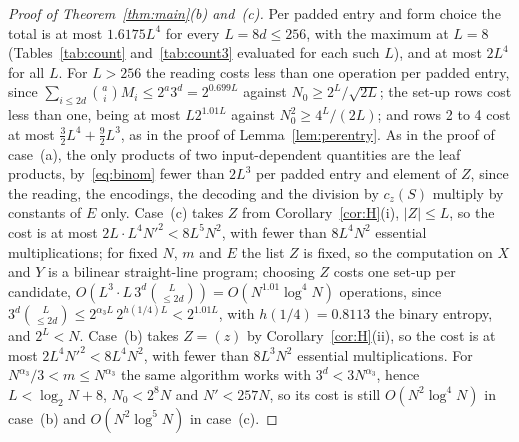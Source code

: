 \documentclass[11pt]{article}
\theoremstyle{definition}
\theoremstyle{remark}
\newcommand{\Nz}{N_0}
\begin{document}
\begin{proof}[Proof of Theorem~\ref{thm:main}(b) and~(c)]
Per padded entry and form choice the total is at most $1.6175L^4$ for every $L=8d\le256$, with the maximum at $L=8$ (Tables~\ref{tab:count} and~\ref{tab:count3} evaluated for each such $L$), and at most $2L^4$ for all $L$. For $L>256$ the reading costs less than one operation per padded entry, since $\sum_{i\le2d}\binom aiM_i\le2^a3^d=2^{0.699L}$ against $\Nz\ge2^L/\sqrt{2L}$; the set-up rows cost less than one, being at most $L2^{1.01L}$ against $\Nz^2\ge4^L/(2L)$; and rows 2 to 4 cost at most $\frac32L^4+\frac92L^3$, as in the proof of Lemma~\ref{lem:perentry}. %
As in the proof of case~(a), the only products of two input-dependent quantities are the leaf products, by~\eqref{eq:binom} fewer than $2L^3$ per padded entry and element of $Z$, since the reading, the encodings, the decoding and the division by $c_z(S)$ multiply by constants of $E$ only. Case~(c) takes $Z$ from Corollary~\ref{cor:H}(i), $|Z|\le L$, so the cost is at most $2L\cdot L^4N'^2<8L^5N^2$, with fewer than $8L^4N^2$ essential multiplications; for fixed $N$, $m$ and $E$ the list $Z$ is fixed, so the computation on $X$ and $Y$ is a bilinear straight-line program; choosing $Z$ costs one set-up per candidate, $O(L^3\cdot L\,3^d\binom L{\le2d})=O(N^{1.01}\log^4N)$ operations, since $3^d\binom L{\le2d}\le2^{\alpha_3L}\,2^{h(1/4)L}<2^{1.01L}$, with $h(1/4)=0.8113$ the binary entropy, and $2^L<N$. Case~(b) takes $Z=(z)$ by Corollary~\ref{cor:H}(ii), so the cost is at most $2L^4N'^2<8L^4N^2$, with fewer than $8L^3N^2$ essential multiplications. For $N^{\alpha_3}/3<m\le N^{\alpha_3}$ the same algorithm works with $3^d<3N^{\alpha_3}$, hence $L<\log_2N+8$, $\Nz<2^8N$ and $N'<257N$, so its cost is still $O(N^2\log^4N)$ in case~(b) and $O(N^2\log^5N)$ in case~(c).
\end{proof}
\end{document}
